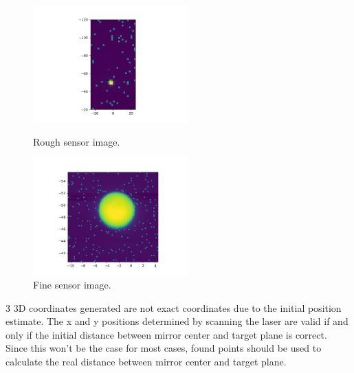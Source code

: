 \begin{figure}[!htb]\centering
    \includegraphics*[width = 6cm]{bilder/project/sensor_im1.png}
    \caption{Rough sensor image.}
    \label{fig:sensor_rough}

    \includegraphics*[width = 6cm]{bilder/project/sensor_im2.png}
    \caption{Fine sensor image.}
    \label{fig:sensor_rough}
\end{figure}





3 3D coordinates generated are not exact coordinates due to the 
initial position estimate. The x and y positions determined by 
scanning the laser are valid if and only if the initial distance 
between mirror center and target plane is correct. Since this won't 
be the case for most cases, found points should be used to calculate 
the real distance between mirror center and target plane. 


